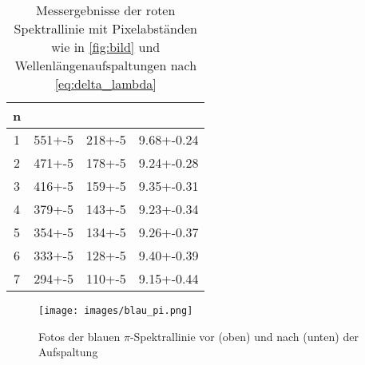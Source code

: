 \begin{table}[h]
    \centering
    \caption{Messergebnisse der roten Spektrallinie mit Pixelabständen wie in \autoref{fig:bild} und Wellenlängenaufspaltungen nach \autoref{eq:delta_lambda}}
    \label{tab:rot}
    \begin{tabular}{S[table-format=1.0] S[table-format=3.0(1)] S[table-format=3.0(1)] S[table-format=1.2(3)]}
        \toprule
        n &  & & \tableSI{\delta \lambda}{\pico\meter}  \\
         & 551+-5 & 218+-5 & 9.68+-0.24 \\
        2 & 471+-5 & 178+-5 & 9.24+-0.28 \\
        3 & 416+-5 & 159+-5 & 9.35+-0.31 \\
        4 & 379+-5 & 143+-5 & 9.23+-0.34 \\
        5 & 354+-5 & 134+-5 & 9.26+-0.37 \\
        6 & 333+-5 & 128+-5 & 9.40+-0.39 \\
        7 & 294+-5 & 110+-5 & 9.15+-0.44 \\
        \bottomrule
    \end{tabular}
\end{table}

\begin{figure}[h]
    \centering
    \texttt{[image: images/blau\_pi.png]}
    \caption{Fotos der blauen $\pi$-Spektrallinie vor (oben) und nach (unten) der Aufspaltung}
    \label{fig:blau_pi}
\end{figure}

